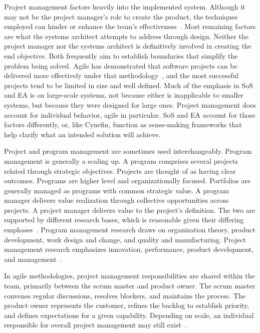 \documentclass{csimq}
\begin{document}
Project management factors heavily into the implemented system. Although it may
not be the project manager's role to create the product, the techniques employed
can hinder or enhance the team's effectiveness~\cite{munns1996}. Most remaining
factors are what the systems architect attempts to address through design.
Neither the project manager nor the systems architect is definitively involved
in creating the end objective. Both frequently aim to establish boundaries that
simplify the problem being solved. Agile has demonstrated that software projects
can be delivered more effectively under that
methodology~\cite{sandle2020,rasnacis2017}, and the most successful projects
tend to be limited in size and well defined. Much of the emphasis in SoS and EA
is on large-scale systems, not because either is inapplicable to smaller
systems, but because they were designed for large ones. Project management does
account for individual behavior, agile in particular. SoS and EA account for
those factors differently, or, like Cynefin, function as sense-making frameworks
that help clarify what an intended solution will achieve.

Project and program management are sometimes used interchangeably. Program
management is generally a scaling up. A program comprises several projects
related through strategic objectives. Projects are thought of as having clear
outcomes. Programs are higher level and organizationally focused. Portfolios are
generally managed as programs with common strategic value. A program manager
delivers value realization through collective opportunities across projects. A
project manager delivers value to the project's definition. The two are
supported by different research bases, which is reasonable given their differing
emphases~\cite{weaver2010}. Program management research draws on organization
theory, product development, work design and change, and quality and
manufacturing. Project management research emphasizes innovation, performance,
product development, and management~\cite{artto2009}.

In agile methodologies, project management responsibilities are shared within
the team, primarily between the scrum master and product owner. The scrum master
convenes regular discussions, resolves blockers, and maintains the process. The
product owner represents the customer, refines the backlog to establish
priority, and defines expectations for a given capability. Depending on scale,
an individual responsible for overall project management may still
exist~\cite{sliger2011}.
\end{document}
